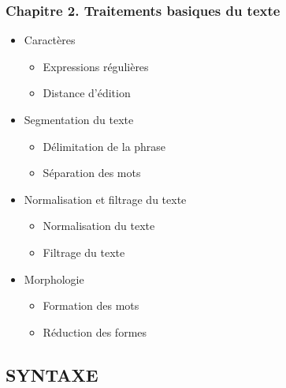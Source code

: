 \documentclass[11pt, a4paper]{article}
\begin{document}
\begin{tcolorbox}
\subsubsection*{Chapitre 2. Traitements basiques du texte}

\begin{multicols}{2}
\begin{itemize}
	\item Caractères
	\begin{itemize}
		\item Expressions régulières
		\item Distance d'édition
	\end{itemize}
	\item Segmentation du texte
	\begin{itemize}
		\item Délimitation de la phrase
		\item Séparation des mots
	\end{itemize}
	\item Normalisation et filtrage du texte
	\begin{itemize}
		\item Normalisation du texte
		\item Filtrage du texte
	\end{itemize}
	\item Morphologie
	\begin{itemize}
		\item Formation des mots
		\item Réduction des formes
	\end{itemize}
\end{itemize}
\end{multicols}
\end{tcolorbox}

\subsection*{\uppercase{Syntaxe}}
\end{document}
